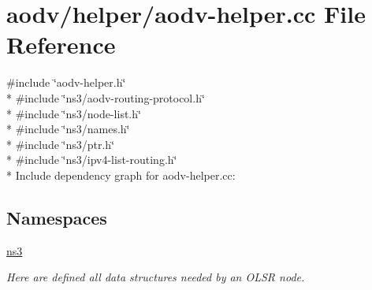 \hypertarget{aodv-helper_8cc}{}\section{aodv/helper/aodv-\/helper.cc File Reference}
\label{aodv-helper_8cc}
{\ttfamily \#include \char`\"{}aodv-\/helper.\+h\char`\"{}}\\*
{\ttfamily \#include \char`\"{}ns3/aodv-\/routing-\/protocol.\+h\char`\"{}}\\*
{\ttfamily \#include \char`\"{}ns3/node-\/list.\+h\char`\"{}}\\*
{\ttfamily \#include \char`\"{}ns3/names.\+h\char`\"{}}\\*
{\ttfamily \#include \char`\"{}ns3/ptr.\+h\char`\"{}}\\*
{\ttfamily \#include \char`\"{}ns3/ipv4-\/list-\/routing.\+h\char`\"{}}\\*
Include dependency graph for aodv-\/helper.cc\+:
\subsection*{Namespaces}
\begin{DoxyCompactItemize}
\item 
 \hyperlink{namespacens3}{ns3}
\begin{DoxyCompactList}\small\item\em Here are defined all data structures needed by an O\+L\+SR node. \end{DoxyCompactList}\end{DoxyCompactItemize}
